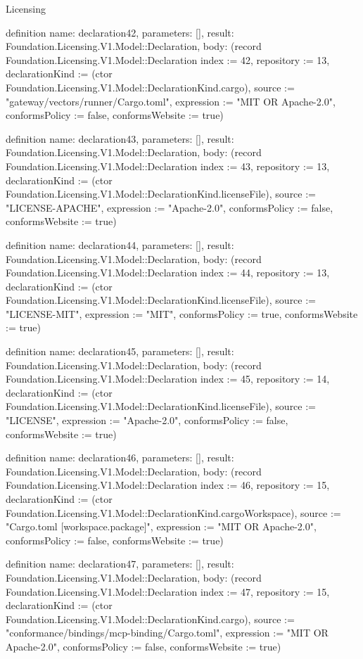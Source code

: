 \begin{lexlean}{Licensing}
\begin{semanticmodule}
definition{
  name: declaration42,
  parameters: [],
  result: Foundation.Licensing.V1.Model::Declaration,
  body: (record Foundation.Licensing.V1.Model::Declaration {index := 42, repository := 13, declarationKind := (ctor Foundation.Licensing.V1.Model::DeclarationKind.cargo), source := "gateway/vectors/runner/Cargo.toml", expression := "MIT OR Apache-2.0", conformsPolicy := false, conformsWebsite := true})
}

definition{
  name: declaration43,
  parameters: [],
  result: Foundation.Licensing.V1.Model::Declaration,
  body: (record Foundation.Licensing.V1.Model::Declaration {index := 43, repository := 13, declarationKind := (ctor Foundation.Licensing.V1.Model::DeclarationKind.licenseFile), source := "LICENSE-APACHE", expression := "Apache-2.0", conformsPolicy := false, conformsWebsite := true})
}

definition{
  name: declaration44,
  parameters: [],
  result: Foundation.Licensing.V1.Model::Declaration,
  body: (record Foundation.Licensing.V1.Model::Declaration {index := 44, repository := 13, declarationKind := (ctor Foundation.Licensing.V1.Model::DeclarationKind.licenseFile), source := "LICENSE-MIT", expression := "MIT", conformsPolicy := true, conformsWebsite := true})
}

definition{
  name: declaration45,
  parameters: [],
  result: Foundation.Licensing.V1.Model::Declaration,
  body: (record Foundation.Licensing.V1.Model::Declaration {index := 45, repository := 14, declarationKind := (ctor Foundation.Licensing.V1.Model::DeclarationKind.licenseFile), source := "LICENSE", expression := "Apache-2.0", conformsPolicy := false, conformsWebsite := true})
}

definition{
  name: declaration46,
  parameters: [],
  result: Foundation.Licensing.V1.Model::Declaration,
  body: (record Foundation.Licensing.V1.Model::Declaration {index := 46, repository := 15, declarationKind := (ctor Foundation.Licensing.V1.Model::DeclarationKind.cargoWorkspace), source := "Cargo.toml [workspace.package]", expression := "MIT OR Apache-2.0", conformsPolicy := false, conformsWebsite := true})
}

definition{
  name: declaration47,
  parameters: [],
  result: Foundation.Licensing.V1.Model::Declaration,
  body: (record Foundation.Licensing.V1.Model::Declaration {index := 47, repository := 15, declarationKind := (ctor Foundation.Licensing.V1.Model::DeclarationKind.cargo), source := "conformance/bindings/mcp-binding/Cargo.toml", expression := "MIT OR Apache-2.0", conformsPolicy := false, conformsWebsite := true})
}


\end{semanticmodule}
\end{lexlean}
